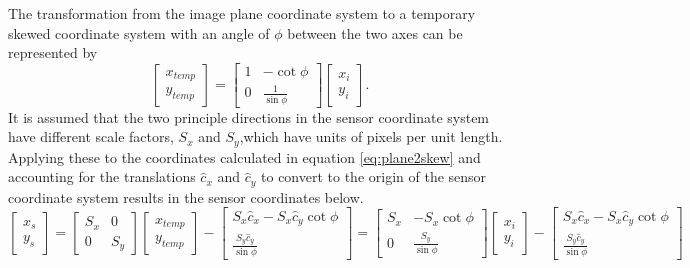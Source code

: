 The transformation from the image plane coordinate system to a temporary skewed coordinate system with an angle of $\phi$ between the two axes can be represented by
\begin{equation}
\label{eq:plane2skew}
	\begin{bmatrix}
	x_{temp} \\
	y_{temp} 
	\end{bmatrix} =
	\begin{bmatrix}
	1 & -\cot \phi \\
	0 & \frac{1}{\sin \phi}
	\end{bmatrix}
	\begin{bmatrix}
	x_i\\
	y_i
	\end{bmatrix}.
\end{equation}
It is assumed that the two principle directions in the sensor coordinate system have different scale factors, $S_x$ and $S_y$,which have units of pixels per unit length. Applying these to the coordinates calculated in equation \ref{eq:plane2skew} and accounting for the translations $\hat c_x$ and $\hat c_y$ to convert to the origin of the sensor coordinate system results in the sensor coordinates below.
\begin{equation}
	\begin{bmatrix}
	x_s \\
	y_s
	\end{bmatrix} = 
	\begin{bmatrix}
	S_x & 0\\
	0 & S_y
	\end{bmatrix}
	\begin{bmatrix}
	x_{temp}\\
	y_{temp}
	\end{bmatrix} -
	\begin{bmatrix}
	S_x \hat c_x - S_x \hat c_y \cot \phi \\
	\frac{S_y \hat c_y}{\sin \phi}
	\end{bmatrix}=
	\begin{bmatrix}
	S_x & -S_x \cot \phi \\
	0 & \frac{S_y}{\sin \phi}
	\end{bmatrix}
	\begin{bmatrix}
	x_i \\
	y_i
	\end{bmatrix} -
	\begin{bmatrix}
	S_x \hat c_x - S_x \hat c_y \cot \phi \\
	\frac{S_y \hat c_y}{\sin \phi}
	\end{bmatrix}
\end{equation}

